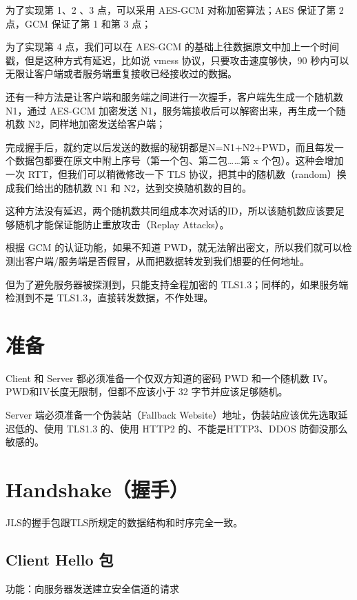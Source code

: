 为了实现第 1、2 、3 点，可以采用 AES-GCM 对称加密算法；AES 保证了第 2 点，GCM 保证了第 1 和第 3 点；

为了实现第 4 点，我们可以在 AES-GCM 的基础上往数据原文中加上一个时间戳，但是这种方式有延迟，比如说 vmess 协议，只要攻击速度够快，90 秒内可以无限让客户端或者服务端重复接收已经接收过的数据。

还有一种方法是让客户端和服务端之间进行一次握手，客户端先生成一个随机数 N1，通过 AES-GCM 加密发送 N1，服务端接收后可以解密出来，再生成一个随机数 N2，同样地加密发送给客户端；

完成握手后，就约定以后发送的数据的秘钥都是N=N1+N2+PWD，而且每发一个数据包都要在原文中附上序号（第一个包、第二包……第 x 个包）。这种会增加一次 RTT，但我们可以稍微修改一下 TLS 协议，把其中的随机数（random）换成我们给出的随机数 N1 和 N2，达到交换随机数的目的。

这种方法没有延迟，两个随机数共同组成本次对话的ID，所以该随机数应该要足够随机才能保证能防止重放攻击（Replay Attacks）。

根据 GCM 的认证功能，如果不知道 PWD，就无法解出密文，所以我们就可以检测出客户端/服务端是否假冒，从而把数据转发到我们想要的任何地址。

但为了避免服务器被探测到，只能支持全程加密的 TLS1.3；同样的，如果服务端检测到不是 TLS1.3，直接转发数据，不作处理。



\section{准备}
Client 和 Server 都必须准备一个仅双方知道的密码 PWD 和一个随机数 IV。PWD和IV长度无限制，但都不应该小于 32 字节并应该足够随机。

Server 端必须准备一个伪装站（Fallback Website）地址，伪装站应该优先选取延迟低的、使用 TLS1.3 的、使用 HTTP2 的、不能是HTTP3、DDOS 防御没那么敏感的。

\section{Handshake（握手）}
JLS的握手包跟TLS所规定的数据结构和时序完全一致。

\subsection{Client Hello 包}
功能：向服务器发送建立安全信道的请求

